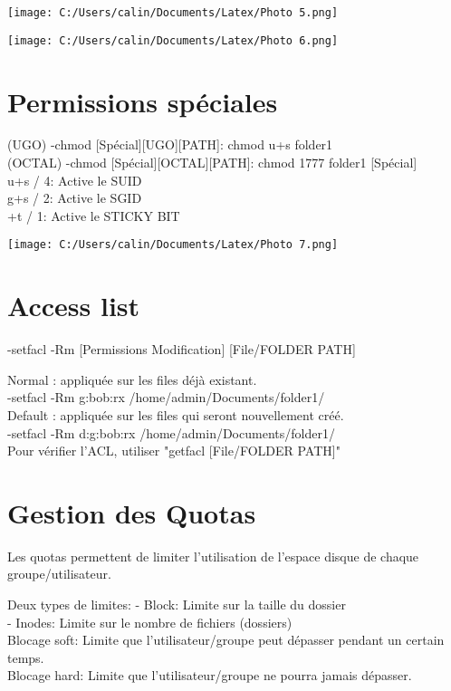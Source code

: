 \documentclass[11pt,a4peper]{article}
\begin{document}
\texttt{[image: C:/Users/calin/Documents/Latex/Photo 5.png]} 

\texttt{[image: C:/Users/calin/Documents/Latex/Photo 6.png]} 

\section{Permissions spéciales}

(UGO) -chmod [Spécial][UGO][PATH]: chmod u+s folder1 \\
(OCTAL) -chmod [Spécial][OCTAL][PATH]: chmod 1777 folder1
[Spécial]\\
u+s / 4: Active le SUID\\
g+s / 2: Active le SGID\\
+t / 1: Active le STICKY BIT

\texttt{[image: C:/Users/calin/Documents/Latex/Photo 7.png]}

\section{Access list}

-setfacl -Rm [Permissions Modification] [File/FOLDER PATH]

Normal : appliquée sur les files déjà existant.\\
-setfacl -Rm g:bob:rx /home/admin/Documents/folder1/\\
Default : appliquée sur les files qui seront nouvellement créé.\\
-setfacl -Rm d:g:bob:rx /home/admin/Documents/folder1/ \\
Pour vérifier l'ACL, utiliser "getfacl [File/FOLDER PATH]"

\section{Gestion des Quotas}

Les quotas permettent de limiter l'utilisation de l'espace disque de chaque groupe/utilisateur.

Deux types de limites:
- Block: Limite sur la taille du dossier\\
- Inodes: Limite sur le nombre de fichiers (dossiers)\\

Blocage soft: Limite que l'utilisateur/groupe peut dépasser pendant un certain temps.\\
Blocage hard: Limite que l'utilisateur/groupe ne pourra jamais dépasser.
\end{document}
